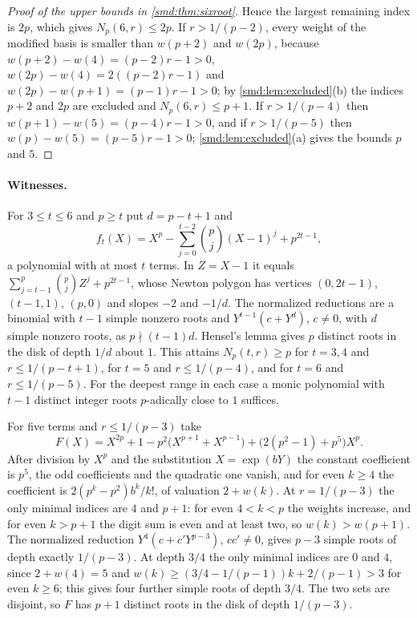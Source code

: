 \begin{proof}[Proof of the upper bounds in \cref{smd:thm:sixroot}]
Hence the largest remaining index is $2p$, which gives $N_p(6,r)\le2p$. If $r>1/(p-2)$, every
weight of the modified basis is smaller than $w(p+2)$ and $w(2p)$, because
$w(p+2)-w(4)=(p-2)r-1>0$, $w(2p)-w(4)=2((p-2)r-1)$ and $w(2p)-w(p+1)=(p-1)r-1>0$; by
\cref{smd:lem:excluded}(b) the indices $p+2$ and $2p$ are excluded and $N_p(6,r)\le p+1$. If
$r>1/(p-4)$ then $w(p+1)-w(5)=(p-4)r-1>0$, and if $r>1/(p-5)$ then
$w(p)-w(5)=(p-5)r-1>0$; \cref{smd:lem:excluded}(a) gives the bounds $p$ and $5$.
\end{proof}

\paragraph{Witnesses.}
For $3\le t\le6$ and $p\ge t$ put $d=p-t+1$ and
\[
 f_t(X)=X^p-\sum_{j=0}^{t-2}\binom pj(X-1)^j+p^{2t-1},
\]
a polynomial with at most $t$ terms. In $Z=X-1$ it equals
$\sum_{j=t-1}^p\binom pjZ^j+p^{2t-1}$, whose Newton polygon has vertices $(0,2t-1)$,
$(t-1,1)$, $(p,0)$ and slopes $-2$ and $-1/d$. The normalized reductions are a binomial with
$t-1$ simple nonzero roots and $Y^{t-1}(c+Y^d)$, $c\ne0$, with $d$ simple nonzero roots, as
$p\nmid(t-1)d$. Hensel's lemma gives $p$ distinct roots in the disk of depth $1/d$ about $1$.
This attains $N_p(t,r)\ge p$ for $t=3,4$ and $r\le1/(p-t+1)$, for $t=5$ and
$r\le1/(p-4)$, and for $t=6$ and $r\le1/(p-5)$. For the deepest range in each case a
monic polynomial with $t-1$ distinct integer roots $p$-adically close to $1$ suffices.

For five terms and $r\le1/(p-3)$ take
\[
 F(X)=X^{2p}+1-p^2\bigl(X^{p+1}+X^{p-1}\bigr)+\bigl(2(p^2-1)+p^5\bigr)X^p .
\]
After division by $X^p$ and the substitution $X=\exp(bY)$ the constant coefficient is $p^5$,
the odd coefficients and the quadratic one vanish, and for even $k\ge4$ the coefficient is
$2(p^k-p^2)b^k/k!$, of valuation $2+w(k)$. At $r=1/(p-3)$ the only minimal indices are $4$
and $p+1$: for even $4<k<p$ the weights increase, and for even $k>p+1$ the digit sum is even
and at least two, so $w(k)>w(p+1)$. The normalized reduction $Y^4(c+c'Y^{p-3})$,
$cc'\ne0$, gives $p-3$ simple roots of depth exactly $1/(p-3)$. At depth $3/4$ the only
minimal indices are $0$ and $4$, since $2+w(4)=5$ and
$w(k)\ge(3/4-1/(p-1))k+2/(p-1)>3$ for even $k\ge6$; this gives four further simple roots of
depth $3/4$. The two sets are disjoint, so $F$ has $p+1$ distinct roots in the disk of depth
$1/(p-3)$.

